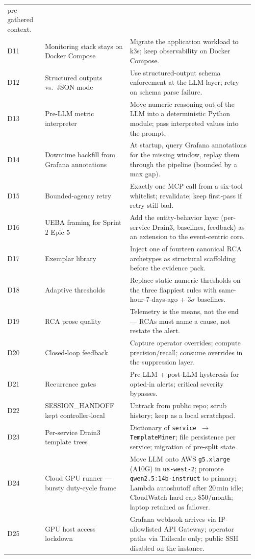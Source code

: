 \documentclass[11pt,a4paper,oneside]{report}
\begin{document}
\begin{longtable}{p{} p{} p{}}
      pre-gathered context. \\
D11 & Monitoring stack stays on Docker Compose
    & Migrate the application workload to k3s; keep observability on
      Docker Compose. \\
D12 & Structured outputs vs.\ JSON mode
    & Use structured-output schema enforcement at the LLM layer;
      retry on schema parse failure. \\
D13 & Pre-LLM metric interpreter
    & Move numeric reasoning out of the LLM into a deterministic
      Python module; pass interpreted values into the prompt. \\
D14 & Downtime backfill from Grafana annotations
    & At startup, query Grafana annotations for the missing window,
      replay them through the pipeline (bounded by a max gap). \\
D15 & Bounded-agency retry
    & Exactly one MCP call from a six-tool whitelist; revalidate;
      keep first-pass if retry still bad. \\
D16 & UEBA framing for Sprint 2 Epic 5
    & Add the entity-behavior layer (per-service Drain3, baselines,
      feedback) as an extension to the event-centric core. \\
D17 & Exemplar library
    & Inject one of fourteen canonical RCA archetypes as structural
      scaffolding before the evidence pack. \\
D18 & Adaptive thresholds
    & Replace static numeric thresholds on the three flappiest rules
      with same-hour-7-days-ago + $3\sigma$ baselines. \\
D19 & RCA prose quality
    & Telemetry is the means, not the end --- RCAs must name a
      cause, not restate the alert. \\
D20 & Closed-loop feedback
    & Capture operator overrides; compute precision/recall;
      consume overrides in the suppression layer. \\
D21 & Recurrence gates
    & Pre-LLM + post-LLM hysteresis for opted-in alerts; critical
      severity bypasses. \\
D22 & SESSION\_HANDOFF kept controller-local
    & Untrack from public repo; scrub history;
      keep as a local scratchpad. \\
D23 & Per-service Drain3 template trees
    & Dictionary of \texttt{service $\to$ TemplateMiner};
      file persistence per service; migration of pre-split state. \\
D24 & Cloud GPU runner --- bursty duty-cycle frame
    & Move LLM onto AWS \texttt{g5.xlarge} (A10G) in
      \texttt{us-west-2}; promote \texttt{qwen2.5:14b-instruct} to
      primary; Lambda autoshutoff after 20\,min idle; CloudWatch
      hard-cap \$50/month; laptop retained as failover. \\
D25 & GPU host access lockdown
    & Grafana webhook arrives via IP-allowlisted API Gateway; operator
      paths via Tailscale only; public SSH disabled on the instance. \\
\end{longtable}
\end{document}
